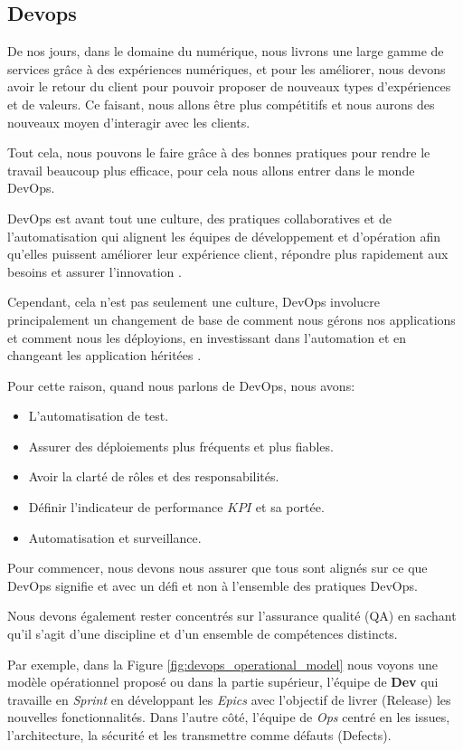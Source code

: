 \subsection{Devops}\label{sec:devops}
De nos jours, dans le domaine du numérique, nous livrons une large gamme de services grâce à des expériences numériques, et pour les améliorer, nous devons avoir le retour du client pour pouvoir proposer de nouveaux types d’expériences et de valeurs. Ce faisant, nous allons être plus compétitifs et nous aurons des nouveaux moyen d'interagir avec les clients.

Tout cela, nous pouvons le faire grâce à des bonnes pratiques pour rendre le travail beaucoup plus efficace, pour cela nous allons entrer dans le monde DevOps.

DevOps est avant tout une culture, des pratiques collaboratives et de l'automatisation qui alignent les équipes de développement et d'opération afin qu'elles puissent améliorer leur expérience client, répondre plus rapidement aux besoins et assurer l'innovation \cite{IsaacSacolick2016DrivingCulture}.

Cependant, cela n'est pas seulement une culture, DevOps involucre principalement un changement de base de comment nous gérons nos applications et comment nous les déployions, en investissant dans l'automation et en changeant les application héritées \cite{benjamin_wootton}.

Pour cette raison, quand nous parlons de DevOps, nous avons:

\begin{itemize}
\item L'automatisation de test.
\item Assurer des déploiements plus fréquents et plus fiables.
\item Avoir la clarté de rôles et des responsabilités.
\item Définir l'indicateur de performance \(KPI\) et sa portée.
\item Automatisation et surveillance.
\end{itemize}

Pour commencer, nous devons nous assurer que tous sont alignés sur ce que DevOps signifie et avec un défi et non à l’ensemble des pratiques DevOps.

Nous devons également rester concentrés sur l’assurance qualité (QA) en sachant qu’il s’agit d’une discipline et d’un ensemble de compétences distincts.

Par exemple, dans la Figure \ref{fig:devops_operational_model} nous voyons une modèle opérationnel proposé ou dans la partie supérieur, l'équipe de \textbf{Dev} qui travaille en \textit{Sprint} en développant les \textit{Epics} avec l'objectif de livrer (Release) les nouvelles fonctionnalités. Dans l'autre côté, l'équipe de \textit{Ops} centré en les issues, l'architecture, la sécurité et les transmettre comme défauts (Defects).



